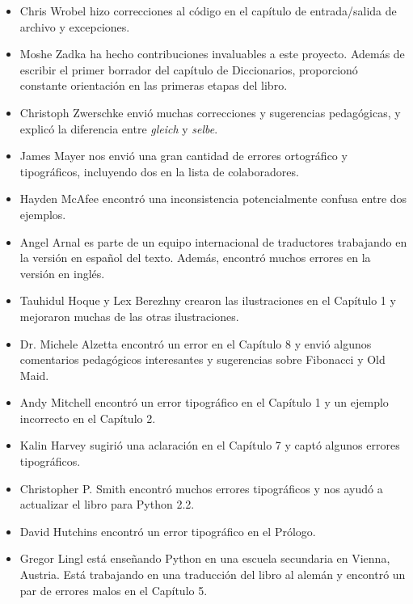 \documentclass[10pt]{book}
\begin{document}
\begin{itemize}
\item Chris Wrobel hizo correcciones al código en el capítulo de
entrada/salida de archivo y excepciones.

\item Moshe Zadka ha hecho contribuciones invaluables a este proyecto.
Además de escribir el primer borrador del capítulo de Diccionarios,
proporcionó constante orientación en las primeras etapas del libro.

\item Christoph Zwerschke envió muchas correcciones y
sugerencias pedagógicas, y explicó la diferencia entre {\em gleich}
y {\em selbe}.

\item James Mayer nos envió una gran cantidad de errores ortográfico
y tipográficos, incluyendo dos en la lista de colaboradores.

\item Hayden McAfee encontró una inconsistencia potencialmente confusa
entre dos ejemplos.

\item Angel Arnal es parte de un equipo internacional de traductores
trabajando en la versión en español del texto.  Además, encontró muchos
errores en la versión en inglés.

\item Tauhidul Hoque y Lex Berezhny crearon las ilustraciones
en el Capítulo 1 y mejoraron muchas de las otras ilustraciones.

\item Dr. Michele Alzetta encontró un error en el Capítulo 8 y envió
algunos comentarios pedagógicos interesantes y sugerencias sobre Fibonacci
y Old Maid.

\item Andy Mitchell encontró un error tipográfico en el Capítulo 1 y un ejemplo
incorrecto en el Capítulo 2.

\item Kalin Harvey sugirió una aclaración en el Capítulo 7 y
captó algunos errores tipográficos.

\item Christopher P. Smith encontró muchos errores tipográficos y nos ayudó a
actualizar el libro para Python 2.2.

\item David Hutchins encontró un error tipográfico en el Prólogo.

\item Gregor Lingl está enseñando Python en una escuela secundaria en Vienna,
Austria.  Está trabajando en una traducción del libro al alemán
y encontró un par de errores malos en el Capítulo 5.


\end{itemize}
\end{document}
